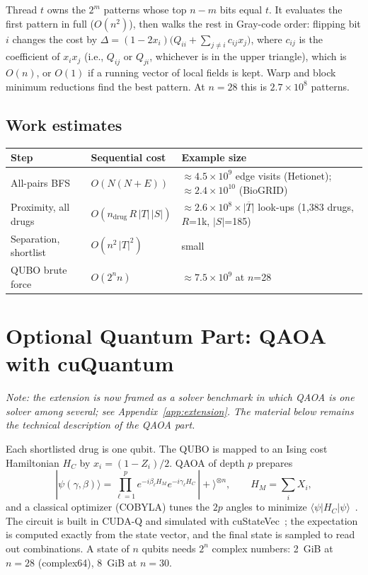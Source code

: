 Thread $t$ owns the $2^m$ patterns whose top $n-m$ bits equal $t$. It
evaluates the first pattern in full ($O(n^2)$), then walks the rest in
Gray-code order: flipping bit $i$ changes the cost by
$\Delta = (1-2x_i)\big(Q_{ii} + \sum_{j\ne i} c_{ij}x_j\big)$, where $c_{ij}$
is the coefficient of $x_ix_j$ (i.e., $Q_{ij}$ or $Q_{ji}$, whichever is in
the upper triangle), which is $O(n)$, or $O(1)$ if a running vector of local fields
is kept. Warp and block minimum reductions find the best pattern. At $n=28$
this is $2.7\times10^8$ patterns.

\subsection{Work estimates}

\begin{center}
\small
\begin{tabular}{@{}lll@{}}
\toprule
Step & Sequential cost & Example size \\
\midrule
All-pairs BFS & $O(N(N+E))$ & $\approx 4.5\times10^{9}$ edge visits (Hetionet); $\approx 2.4\times10^{10}$ (BioGRID) \\
Proximity, all drugs & $O(n_{\text{drug}}\,R\,|T|\,|S|)$ & $\approx 2.6\times10^{8}\times\overline{|T|}$ look-ups (1{,}383 drugs, $R$=1k, $|S|$=185) \\
Separation, shortlist & $O(n^2\,|T|^2)$ & small \\
QUBO brute force & $O(2^n n)$ & $\approx 7.5\times10^{9}$ at $n$=28 \\
\bottomrule
\end{tabular}
\end{center}

\section{Optional Quantum Part: QAOA with cuQuantum}
\label{app:quantum}

\emph{Note: the extension is now framed as a solver benchmark in which QAOA is one
solver among several; see Appendix~\ref{app:extension}. The material below remains the
technical description of the QAOA part.}

Each shortlisted drug is one qubit. The QUBO is mapped to an Ising cost
Hamiltonian $H_C$ by $x_i=(1-Z_i)/2$. QAOA of depth $p$ prepares
\begin{equation}
  |\psi(\gamma,\beta)\rangle = \prod_{\ell=1}^{p} e^{-i\beta_\ell H_M}
  e^{-i\gamma_\ell H_C}\,|+\rangle^{\otimes n}, \qquad H_M=\sum_i X_i,
\end{equation}
and a classical optimizer (COBYLA) tunes the $2p$ angles to minimize
$\langle\psi|H_C|\psi\rangle$~\cite{farhi2014qaoa}. The circuit is built in
CUDA-Q and simulated with cuStateVec~\cite{bayraktar2023cuquantum}; the
expectation is computed exactly from the state vector, and the final state is
sampled to read out combinations. A state of $n$ qubits needs $2^n$ complex
numbers: 2~GiB at $n=28$ (complex64), 8~GiB at $n=30$.

